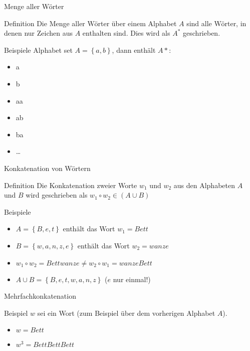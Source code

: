 \begin{frame}{Menge aller Wörter}
    \begin{block}{Definition}
        Die Menge aller Wörter über einem Alphabet $A$ sind alle Wörter, in denen nur Zeichen aus $A$ enthalten sind. Dies wird als $A^*$ geschrieben.
        \end{block}
    \begin{exampleblock}{Beispiele}
        Alphabet set $A = \left\{a, b \right\}$, dann enthält $A*$:
        \begin{itemize}
            \item a
            \item b
            \item aa
            \item ab
            \item ba
            \item \dots
        \end{itemize}
    \end{exampleblock}
\end{frame}

\begin{frame}{Konkatenation von Wörtern}
    \begin{block}{Definition}
        Die Konkatenation zweier Worte $w_1$ und $w_2$ aus den Alphabeten $A$ und $B$ wird geschrieben als $w_1 \circ w_2 \in \left( A \cup B\right)$    
    \end{block}
    \begin{exampleblock}{Beispiele}
        \begin{itemize}
            \item $A = \left\{B, e, t\right\}$  enthält das Wort $w_1 = Bett$\\
            \item $B = \left\{w, a, n, z, e\right\}$ enthält das Wort $w_2 = wanze$\\
                \pause
            \item $w_1 \circ w_2 = Bettwanze \neq w_2 \circ w_1 = wanzeBett$
                \pause
            \item $A \cup B = \left\{B, e, t, w, a, n, z\right\}$ ($e$ nur einmal!)
        \end{itemize}
    \end{exampleblock}
\end{frame}

\begin{frame}{Mehrfachkonkatenation}
    \begin{exampleblock}{Beispiel}
        $w$ sei ein Wort (zum Beispiel über dem vorherigen Alphabet $A$).
        \begin{itemize}
            \item $w = Bett$
            \item $w^3 = BettBettBett$
        \end{itemize}
    \end{exampleblock}
\end{frame}

